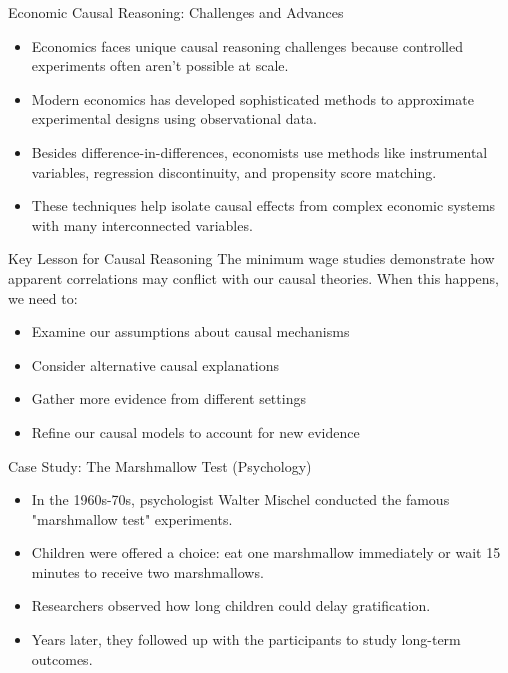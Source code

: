 \documentclass{beamer}
\begin{document}
\begin{frame}{Economic Causal Reasoning: Challenges and Advances}
    \begin{itemize}
        \item Economics faces unique causal reasoning challenges because controlled experiments often aren't possible at scale.
        \item Modern economics has developed sophisticated methods to approximate experimental designs using observational data.
        \item Besides difference-in-differences, economists use methods like instrumental variables, regression discontinuity, and propensity score matching.
        \item These techniques help isolate causal effects from complex economic systems with many interconnected variables.
    \end{itemize}
    
    \begin{alertblock}{Key Lesson for Causal Reasoning}
        \scriptsize
        The minimum wage studies demonstrate how apparent correlations may conflict with our causal theories. When this happens, we need to:
        \begin{itemize}
            \item Examine our assumptions about causal mechanisms
            \item Consider alternative causal explanations
            \item Gather more evidence from different settings
            \item Refine our causal models to account for new evidence
        \end{itemize}
    \end{alertblock}
\end{frame}

\begin{frame}{Case Study: The Marshmallow Test (Psychology)}
    \begin{itemize}
        \item In the 1960s-70s, psychologist Walter Mischel conducted the famous "marshmallow test" experiments.
        \item Children were offered a choice: eat one marshmallow immediately or wait 15 minutes to receive two marshmallows.
        \item Researchers observed how long children could delay gratification.
        \item Years later, they followed up with the participants to study long-term outcomes.
    \end{itemize}
    
\end{frame}
\end{document}
